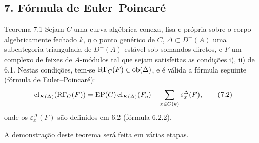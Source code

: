 \subsection*{7. Fórmula de Euler--Poincaré}

\begin{statement}{Teorema 7.1}
Sejam $C$ uma curva algébrica conexa, lisa e própria sobre o corpo algebricamente fechado $k$, $\eta$ o ponto genérico de $C$, $\Delta\subset D^+(A)$ uma subcategoria triangulada de $D^+(A)$ estável sob somandos diretos, e $F$ um complexo de feixes de $A$-módulos tal que sejam satisfeitas as condições i), ii) de 6.1. Nestas condições, tem-se $\mathrm{R}\Gamma_C(F)\in\operatorname{ob}(\Delta)$, e é válida a fórmula seguinte (fórmula de Euler--Poincaré):
\[
\operatorname{cl}_{K(\Delta)}(\mathrm{R}\Gamma_C(F))
=
\operatorname{EP}(C)\operatorname{cl}_{K(\Delta)}(F_{\bar\eta})
-\sum_{x\in C(k)}\varepsilon_x^\Delta(F),
\tag{7.2}
\]
onde os $\varepsilon_x^\Delta(F)$ são definidos em 6.2 (fórmula 6.2.2).
\end{statement}

A demonstração deste teorema será feita em várias etapas.
